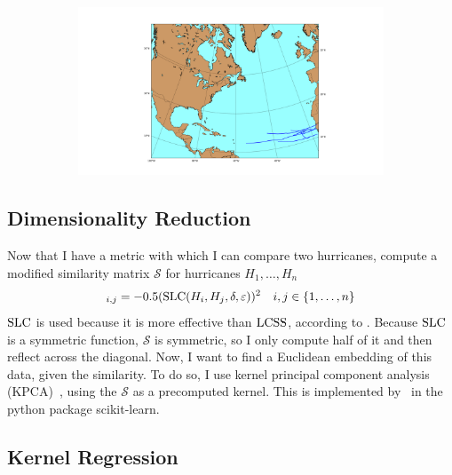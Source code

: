 \begin{figure}
\begin{subfigure}[t]{0.45\textwidth}
	\end{subfigure}
	\begin{subfigure}[t]{0.45\textwidth}
		\centering
		\includegraphics[width=\linewidth, trim=350 50 300 50, clip]{images/similar_hurricanes_4.png}
	\end{subfigure}
\end{figure}

\subsection{Dimensionality Reduction}

\par
Now that I have a metric with which I can compare two hurricanes, compute a modified similarity matrix $\mathcal{S}$ for hurricanes $H_{1},\ldots,H_{n}$
\begin{equation*}
	[\mathcal{S}]_{i,j}=-0.5(\SLC(H_{i},H_{j},\delta,\varepsilon))^{2}\quad{}i,j\in\set{1,\ldots,n}
\end{equation*}
$\operatorname{SLC}$ is used because it is more effective than $\operatorname{LCSS}$, according to \cite{ho2015manifold}.
Because $\operatorname{SLC}$ is a symmetric function, $\mathcal{S}$ is symmetric, so I only compute half of it and then reflect across the diagonal.
Now, I want to find a Euclidean embedding of this data, given the similarity.
To do so, I use kernel principal component analysis (KPCA)~\cite{scholkopf1997kernel}, using the $\mathcal{S}$ as a precomputed kernel.
This is implemented by~\cite{scikit-learn} in the python package scikit-learn.

\subsection{Kernel Regression}